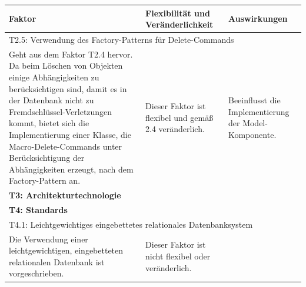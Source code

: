 \documentclass[fontsize=12pt,paper=a4,twoside]{scrartcl}
\begin{document}
\begin{tabularx}{\textwidth}{|X|X|X|}
\hline
\textbf{Faktor} & \textbf{Flexibilität und Veränderlichkeit} & \textbf{Auswirkungen}\\\hline
\hline
\multicolumn{3}{|l|}{T2.5: Verwendung des Factory-Patterns für Delete-Commands}\\\hline
Geht aus dem Faktor T2.4 hervor. Da beim Löschen von Objekten einige Abhängigkeiten zu berücksichtigen sind, damit es in der Datenbank nicht zu Fremdschlüssel-Verletzungen kommt, bietet sich die Implementierung einer Klasse, die Macro-Delete-Commands unter Berücksichtigung der Abhängigkeiten erzeugt, nach dem Factory-Pattern an.& Dieser Faktor ist flexibel und gemäß 2.4 veränderlich. & Beeinflusst die Implementierung der Model-Komponente. \\\hline
\multicolumn{3}{|l|}{\textbf{T3: Architekturtechnologie}}\\\hline

\multicolumn{3}{|l|}{\textbf{T4: Standards}}\\\hline
\multicolumn{3}{|l|}{T4.1: Leichtgewichtiges eingebettetes relationales Datenbanksystem}\\\hline
Die Verwendung einer leichtgewichtigen, eingebetteten relationalen Datenbank ist vorgeschrieben. & Dieser Faktor ist nicht flexibel oder veränderlich. & \\\hline
\end{tabularx}

\clearpage
\end{document}
